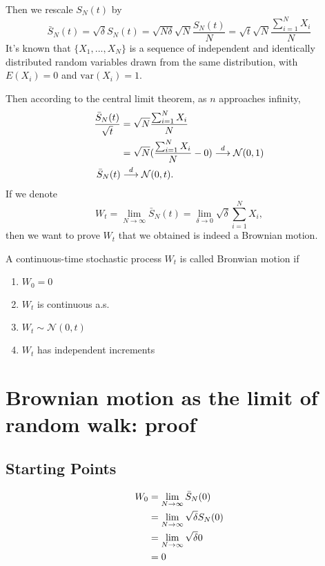 Then we rescale $S_N(t)$ by
\begin{equation}
  \bar{S}_N(t)=\sqrt{\delta} S_N(t)=\sqrt{N\delta}\sqrt{N}\frac{S_N(t)}{N}
  =\sqrt{t}\sqrt{N}\frac{\sum_{i=1}^{N} X_i}{N}
\end{equation}
It's known that $\{X_1,...,X_N\}$ is a sequence of independent and
identically distributed random variables drawn from the same
distribution, with $E(X_i)=0$ and $\mbox{var}(X_i)=1$.


Then according to the central limit theorem, as $n$ approaches infinity,
\begin{align}
  \frac{\bar{S}_N(t)}{\sqrt{t}}&=\sqrt{N}\frac{\sum_{i=1}^{N} X_i}{N}\\\notag
  &=\sqrt{N}(\frac{\sum_{i=1}^{N} X_i}{N}-0)\stackrel{d}{\longrightarrow} \mathcal{N}(0,1)\\
  \bar{S}_N(t)&\stackrel{d}{\longrightarrow} \mathcal{N}(0,t).
\end{align}
If we denote
\begin{equation}
  W_t=\lim_{N\rightarrow \infty} \bar{S}_N(t)=\lim_{\delta\rightarrow 0} \sqrt{\delta} \sum_{i=1}^{N} X_i,
\end{equation}
then we want to prove  $W_t$ that we obtained is indeed a Brownian motion.
\begin{definition}
A continuous-time stochastic process $W_t$ is called Bronwian motion if
\begin{enumerate}
\item $W_0=0$
\item $W_t$ is continuous a.s.
\item $W_t \sim \mathcal{N}(0,t)$
\item $W_t$ has independent increments
\end{enumerate}
\end{definition}

\section{Brownian motion as the limit of random walk: proof}


\subsection{Starting Points}
\begin{align}
  W_0&=\lim_{N\rightarrow \infty} \bar{S}_N(0)\\\notag
     &=\lim_{N\rightarrow \infty} \sqrt{\delta} S_N(0)\\\notag
     &=\lim_{N\rightarrow \infty} \sqrt{\delta} 0\\\notag
     &=0\\\notag
\end{align}

